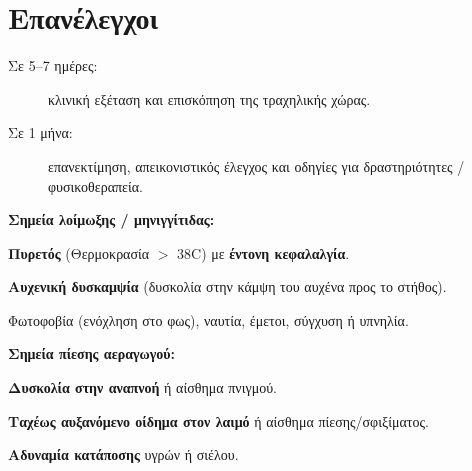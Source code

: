\documentclass[10pt,greek]{article}
\begin{document}
\section*{Επανέλεγχοι}
\begin{description}
\item[Σε 5--7 ημέρες:] κλινική εξέταση και επισκόπηση της τραχηλικής χώρας.
\item[Σε 1 μήνα:] επανεκτίμηση, απεικονιστικός έλεγχος και οδηγίες για δραστηριότητες / φυσικοθεραπεία.
\end{description}

\begin{UrgentBox}
\item[] \textbf{Σημεία λοίμωξης / μηνιγγίτιδας:}
\item \textbf{Πυρετός} (Θερμοκρασία $>$ 38\textdegree{}C) με \textbf{έντονη κεφαλαλγία}.
\item \textbf{Αυχενική δυσκαμψία} (δυσκολία στην κάμψη του αυχένα προς το στήθος).
\item Φωτοφοβία (ενόχληση στο φως), ναυτία, έμετοι, σύγχυση ή υπνηλία.
\item[] \textbf{Σημεία πίεσης αεραγωγού:}
\item \textbf{Δυσκολία στην αναπνοή} ή αίσθημα πνιγμού.
\item \textbf{Ταχέως αυξανόμενο οίδημα στον λαιμό} ή αίσθημα πίεσης/σφιξίματος.
\item \textbf{Αδυναμία κατάποσης} υγρών ή σιέλου.
\end{UrgentBox}
\end{document}
